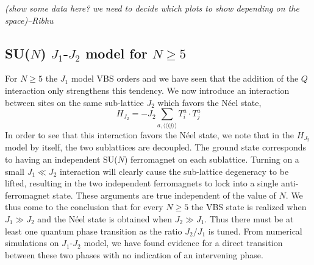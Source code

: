 \documentclass[aps,prb,groupedaddress,twocolumn]{revtex4}
\begin{document}
{\em (show some data here? we need to decide which plots to show
  depending on the space)--Ribhu}

\subsection{SU($N$) $J_1$-$J_2$ model for $N\geq 5$}
\label{ss:j1j2N}

For $N\geq 5$ the $J_1$ model VBS orders and we have seen that the
addition of the $Q$ interaction only strengthens this tendency. We now
introduce an interaction between sites on the same sub-lattice $J_2$ which favors the N\'eel state,
\begin{equation}
H_{J_2}= -J_2 \sum_{a,\langle\langle ij\rangle\rangle} T^a_i\cdot T^{a}_j
\end{equation}
In order to see that this interaction favors the N\'eel state, we note
that in the $H_{J_2}$ model by itself, the two sublattices are
decoupled. The ground state corresponds to having an independent SU($N$) ferromagnet on
each sublattice. Turning on a small $J_1\ll J_2$ interaction will clearly cause
the sub-lattice degeneracy to be lifted, resulting in the
two independent ferromagnets to lock into a single
anti-ferromagnet state. These arguments are true independent of the
value of $N$. We thus
come to the conclusion that for every $N\geq 5$ the VBS state is
realized when $J_1\gg J_2$ and the N\'eel state is obtained when $J_2
\gg J_1$. Thus there must be at least one quantum phase transition as
the ratio
$J_2/J_1$ is tuned. From numerical simulations on $J_1$-$J_2$ model, we have found
evidence for a direct transition between these two phases with no
indication of an intervening phase. 
\end{document}
